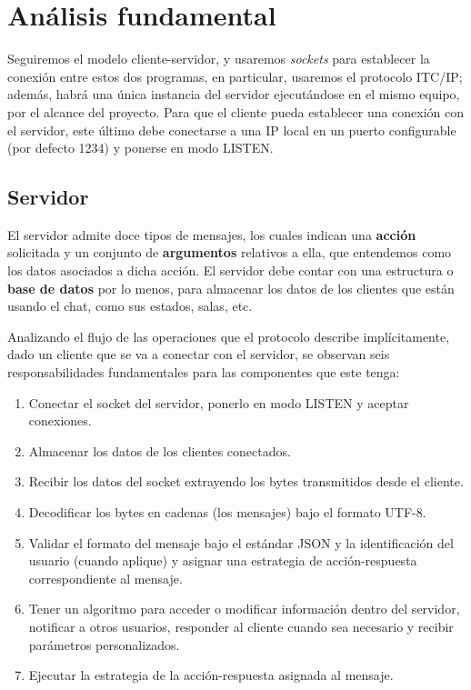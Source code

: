 \chapter{Análisis fundamental}

Seguiremos el modelo cliente-servidor, y usaremos \textit{sockets} para establecer la conexión entre estos dos programas, en particular, usaremos el protocolo ITC/IP; además, habrá una única instancia del servidor ejecutándose en el mismo equipo, por el alcance del proyecto.
Para que el cliente pueda establecer una conexión con el servidor, este último debe conectarse a una IP local en un puerto configurable (por defecto 1234) y ponerse en modo LISTEN.

\section{Servidor}

El servidor admite doce tipos de mensajes, los cuales indican una \textbf{acción} solicitada y un conjunto de \textbf{argumentos} relativos a ella, que entendemos como los datos asociados a dicha acción.
El servidor debe contar con una estructura o \textbf{base de datos} por lo menos, para almacenar los datos de los clientes que están usando el chat, como sus estados, salas, etc.

Analizando el flujo de las operaciones que el protocolo describe implícitamente, dado un cliente que se va a conectar con el servidor, se observan seis responsabilidades fundamentales para las componentes que este tenga:

\begin{enumerate}
	\item Conectar el socket del servidor, ponerlo en modo LISTEN y aceptar conexiones.
	\item Almacenar los datos de los clientes conectados.
	\item Recibir los datos del socket extrayendo los bytes transmitidos desde el cliente.
	\item Decodificar los bytes en cadenas (los mensajes) bajo el formato UTF-8.
	\item Validar el formato del mensaje bajo el estándar JSON y la identificación del usuario (cuando aplique) y asignar una estrategia de acción-respuesta correspondiente al mensaje.
	\item Tener un algoritmo para acceder o modificar información dentro del servidor, notificar a otros usuarios, responder al cliente cuando sea necesario y recibir parámetros personalizados.
	\item Ejecutar la estrategia de la acción-respuesta asignada al mensaje.
\end{enumerate}

